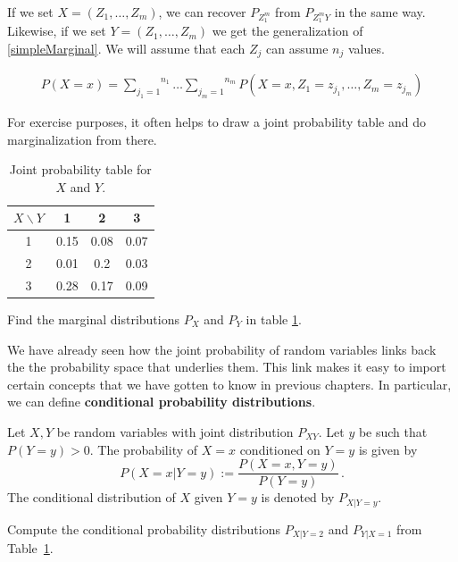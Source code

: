 If we set $ X = (Z_{1}, \ldots, Z_{m}) $, we can recover $ P_{Z_{1}^{m}} $ from $ P_{Z_{1}^{m}Y} $ in the same way. Likewise,
if we set $ Y = (Z_{1}, \ldots, Z_{m}) $ we get the generalization of \eqref{simpleMarginal}. We will assume that each $ Z_{j} $
can assume $ n_{j} $ values.

\begin{align}
P(X=x) = \overset{n_{1}}{\underset{j_{1}=1}{\sum}}\ldots \overset{n_{m}}{\underset{j_{m}=1}{\sum}} 
P(X=x,Z_{1}=z_{j_{1}}, \ldots, Z_{m}=z_{j_{m}})
\end{align}

For exercise purposes, it often helps to draw a joint probability table and do marginalization from there.

\begin{table}
\center
\begin{tabular}{|c|c|c|c|}
\hline
$X\backslash Y$	& 1		& 2		& 3		\\
\hline
1				& 0.15	& 0.08	& 0.07	\\
2				& 0.01	& 0.2	& 0.03	\\	
3				& 0.28	& 0.17	& 0.09	\\
\hline
\end{tabular}
\caption{Joint probability table for $ X $ and $ Y $.}
\label{jointTable}
\end{table}

\begin{Exercise}
Find the marginal distributions $ P_X $ and $ P_{Y} $ in table \ref{jointTable}.
\end{Exercise}

We have already seen how the joint probability of random variables links back the the probability space that underlies them.
This link makes it easy to import certain concepts that we have
gotten to know in previous chapters. In particular, we can define \textbf{conditional probability distributions}.

\begin{Definition}
Let $X,Y$ be random variables with joint distribution $P_{XY}$. Let
$y$ be such that $P(Y=y)>0$. The probability of $ X = x $ conditioned on $ Y=y $ is given by
$$ P(X=x|Y=y) := \dfrac{P(X=x, Y=y)}{P(Y=y)} \, . $$
The conditional distribution of $X$ given $Y=y$ is denoted by $P_{X|Y=y}$.
\end{Definition} 

\begin{Exercise}
Compute the conditional probability distributions $ P_{X|Y=2} $ and $ P_{Y|X=1} $ from Table~\ref{jointTable}.
\end{Exercise}

